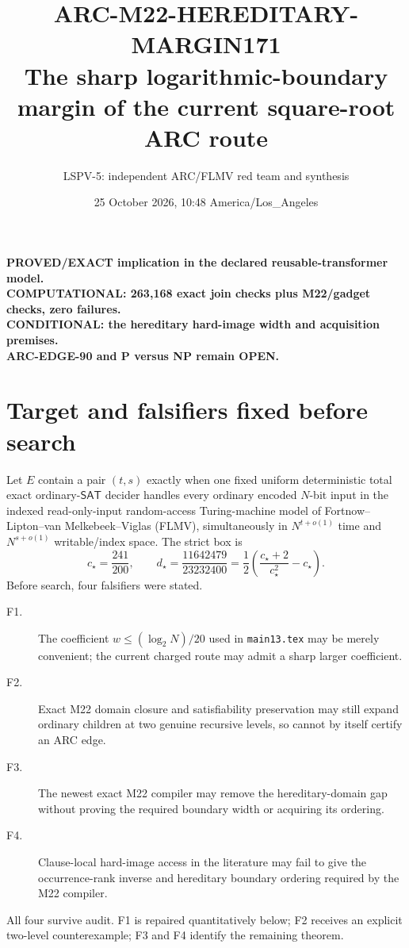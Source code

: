 \documentclass[11pt]{article}
\title{ARC-M22-HEREDITARY-MARGIN171\\
\large The sharp logarithmic-boundary margin of the current square-root ARC route}
\author{LSPV-5: independent ARC/FLMV red team and synthesis}
\date{25 October 2026, 10:48 America/Los\_Angeles}
\newcommand{\SAT}{\mathsf{SAT}}
\begin{document}
\maketitle
\begin{center}
\textbf{PROVED/EXACT implication in the declared reusable-transformer model.}\\
\textbf{COMPUTATIONAL: 263,168 exact join checks plus M22/gadget checks, zero failures.}\\
\textbf{CONDITIONAL: the hereditary hard-image width and acquisition premises.}\\
\textbf{ARC-EDGE-90 and P versus NP remain OPEN.}
\end{center}

\section{Target and falsifiers fixed before search}
Let $E$ contain a pair $(t,s)$ exactly when one fixed uniform deterministic
total exact ordinary-$\SAT$ decider handles every ordinary encoded $N$-bit
input in the indexed read-only-input random-access Turing-machine model of
Fortnow--Lipton--van Melkebeek--Viglas (FLMV), simultaneously in
$N^{t+o(1)}$ time and $N^{s+o(1)}$ writable/index space.  The strict box is
\[
 c_\star=\frac{241}{200},\qquad
 d_\star=\frac{11642479}{23232400}
 =\frac12\left(\frac{c_\star+2}{c_\star^2}-c_\star\right).
\]
Before search, four falsifiers were stated.
\begin{description}
\item[F1.] The coefficient $w\le(\log_2N)/20$ used in \texttt{main13.tex}
may be merely convenient; the current charged route may admit a sharp larger
coefficient.
\item[F2.] Exact M22 domain closure and satisfiability preservation may still
expand ordinary children at two genuine recursive levels, so cannot by itself
certify an ARC edge.
\item[F3.] The newest exact M22 compiler may remove the hereditary-domain gap
without proving the required boundary width or acquiring its ordering.
\item[F4.] Clause-local hard-image access in the literature may fail to give
the occurrence-rank inverse and hereditary boundary ordering required by the
M22 compiler.
\end{description}
All four survive audit.  F1 is repaired quantitatively below; F2 receives an
explicit two-level counterexample; F3 and F4 identify the remaining theorem.
\end{document}
